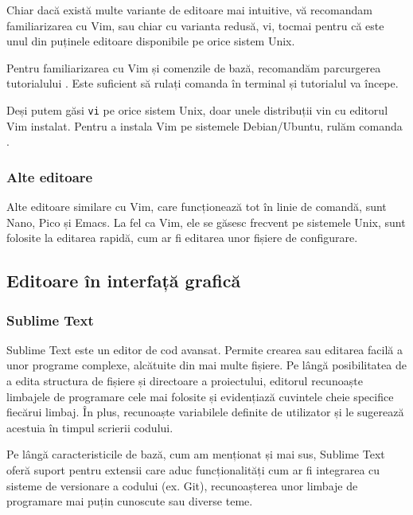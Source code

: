 Chiar dacă există multe variante de editoare mai intuitive, vă recomandam familiarizarea cu Vim, sau chiar cu varianta redusă, vi, tocmai pentru că este unul din puținele editoare disponibile pe orice sistem Unix.

Pentru familiarizarea cu Vim și comenzile de bază, recomandăm parcurgerea tutorialului .
Este suficient să rulați comanda  în terminal și tutorialul va începe.

Deși putem găsi \texttt{vi} pe orice sistem Unix, doar unele distribuții vin cu editorul Vim instalat.
Pentru a instala Vim pe sistemele Debian/Ubuntu, rulăm comanda .

\subsubsection{Alte editoare}
\label{sec:appdev:dev:editor:other}

Alte editoare similare cu Vim, care funcționează tot în linie de comandă, sunt Nano, Pico și Emacs.
La fel ca Vim, ele se găsesc frecvent pe sistemele Unix, sunt folosite la editarea rapidă, cum ar fi editarea unor fișiere de configurare.

\subsection{Editoare în interfață grafică}
\label{sec:appdev:dev:editor-gui}

\subsubsection{Sublime Text}
\label{sec:appdev:dev:editor-gui:sublime}

Sublime Text este un editor de cod avansat.
Permite crearea sau editarea facilă a unor programe complexe, alcătuite din mai multe fișiere.
Pe lângă posibilitatea de a edita structura de fișiere și directoare a proiectului, editorul recunoaște limbajele de programare cele mai folosite și evidențiază cuvintele cheie specifice fiecărui limbaj.
În plus, recunoaște variabilele definite de utilizator și le sugerează acestuia în timpul scrierii codului.

Pe lângă caracteristicile de bază, cum am menționat și mai sus, Sublime Text oferă suport pentru extensii care aduc funcționalități cum ar fi integrarea cu sisteme de versionare a codului (ex. Git), recunoașterea unor limbaje de programare mai puțin cunoscute sau diverse teme.

